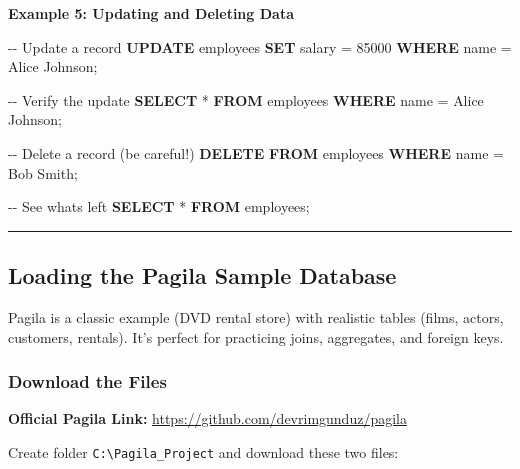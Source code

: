\documentclass[
  letterpaper,
  DIV=11,
  numbers=noendperiod]{scrartcl}
\newenvironment{Shaded}{\begin{snugshade}}{\end{snugshade}}
\newcommand{\CommentTok}[1]{\textcolor[rgb]{0.37,0.37,0.37}{#1}}
\newcommand{\DecValTok}[1]{\textcolor[rgb]{0.68,0.00,0.00}{#1}}
\newcommand{\KeywordTok}[1]{\textcolor[rgb]{0.00,0.23,0.31}{\textbf{#1}}}
\newcommand{\NormalTok}[1]{\textcolor[rgb]{0.00,0.23,0.31}{#1}}
\newcommand{\OperatorTok}[1]{\textcolor[rgb]{0.37,0.37,0.37}{#1}}
\newcommand{\StringTok}[1]{\textcolor[rgb]{0.13,0.47,0.30}{#1}}
\begin{document}
\textbf{Example 5: Updating and Deleting Data}

\begin{Shaded}
\begin{Highlighting}[]
\CommentTok{{-}{-} Update a record}
\KeywordTok{UPDATE}\NormalTok{ employees }
\KeywordTok{SET}\NormalTok{ salary }\OperatorTok{=} \DecValTok{85000} 
\KeywordTok{WHERE}\NormalTok{ name }\OperatorTok{=} \StringTok{\textquotesingle{}Alice Johnson\textquotesingle{}}\NormalTok{;}

\CommentTok{{-}{-} Verify the update}
\KeywordTok{SELECT} \OperatorTok{*} \KeywordTok{FROM}\NormalTok{ employees }\KeywordTok{WHERE}\NormalTok{ name }\OperatorTok{=} \StringTok{\textquotesingle{}Alice Johnson\textquotesingle{}}\NormalTok{;}

\CommentTok{{-}{-} Delete a record (be careful!)}
\KeywordTok{DELETE} \KeywordTok{FROM}\NormalTok{ employees }\KeywordTok{WHERE}\NormalTok{ name }\OperatorTok{=} \StringTok{\textquotesingle{}Bob Smith\textquotesingle{}}\NormalTok{;}

\CommentTok{{-}{-} See what\textquotesingle{}s left}
\KeywordTok{SELECT} \OperatorTok{*} \KeywordTok{FROM}\NormalTok{ employees;}
\end{Highlighting}
\end{Shaded}

\begin{center}\rule{0.5\linewidth}{0.5pt}\end{center}

\subsection{\texorpdfstring{Loading the \textbf{Pagila} Sample
Database}{Loading the Pagila Sample Database}}\label{loading-the-pagila-sample-database}

Pagila is a classic example (DVD rental store) with realistic tables
(films, actors, customers, rentals). It's perfect for practicing joins,
aggregates, and foreign keys.

\subsubsection{Download the Files}\label{download-the-files}

\textbf{Official Pagila Link:}
\url{https://github.com/devrimgunduz/pagila}

Create folder \texttt{C:\textbackslash{}Pagila\_Project} and download
these two files:
\end{document}
